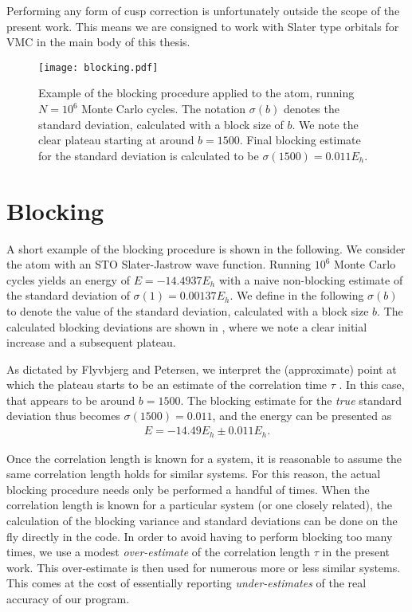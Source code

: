 \documentclass[../../master.tex]{subfiles}
\begin{document}
Performing any form of cusp correction is unfortunately outside the scope of the present work. This means we are consigned to work with Slater type orbitals for VMC in the main body of this thesis.





\begin{SCfigure}
\centering
\texttt{[image: blocking.pdf]}
\caption{Example of the blocking procedure applied to the  atom, running $N=10^6$ Monte Carlo cycles. The notation $\sigma(b)$ denotes the standard deviation, calculated with a block size of $b$. We note the clear plateau starting at around $b=1500$. Final blocking estimate for the standard deviation is calculated to be $\sigma(1500)=0.011 E_h$. \label{fig:blocking}}
\end{SCfigure}

\section{Blocking}
A short example of the blocking procedure is shown in the following. We consider the  atom with an STO Slater-Jastrow wave function. Running $10^6$ Monte Carlo cycles yields an energy of $E=-14.4937 E_h$ with a naive non-blocking estimate of the standard deviation of $\sigma(1)=0.00137 E_h$. We define in the following $\sigma(b)$ to denote the value of the standard deviation, calculated with a block size $b$. The calculated blocking deviations are shown in , where we note a clear initial increase and a subsequent plateau. 

As dictated by Flyvbjerg and Petersen, we interpret the (approximate) point at which the plateau starts to be an estimate of the correlation time $\tau$ \cite{blocking}. In this case, that appears to be around $b=1500$. The blocking estimate for the \emph{true} standard deviation thus becomes $\sigma(1500)=0.011$, and the energy can be presented as 
\begin{align}
E=-14.49E_h \pm 0.011 E_h.
\end{align} 

Once the correlation length is known for a system, it is reasonable to assume the same correlation length holds for similar systems. For this reason, the actual blocking procedure needs only be performed a handful of times. When the correlation length is known for a particular system (or one closely related), the calculation of the blocking variance and standard deviations can be done on the fly directly in the \CC{}{ }code. In order to avoid having to perform blocking too many times, we use a modest \emph{over-estimate} of the correlation length $\tau$ in the present work. This over-estimate is then used for numerous more or less similar systems. This comes at the cost of essentially reporting \emph{under-estimates} of the real accuracy of our program.
\end{document}
